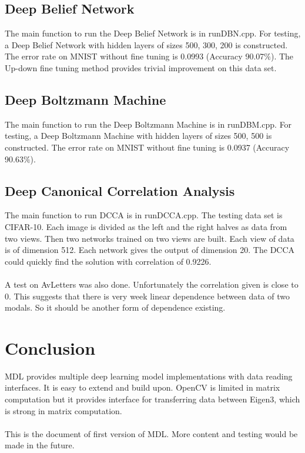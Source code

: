 \documentclass[12pt]{article}
\begin{document}
\subsection{Deep Belief Network}
The main function to run the Deep Belief Network is in runDBN.cpp. For testing, a Deep Belief Network with hidden layers of sizes 500, 300, 200 is constructed. The error rate on MNIST without fine tuning is 0.0993 (Accuracy 90.07$\%$). The Up-down fine tuning method provides trivial improvement on this data set.
\subsection{Deep Boltzmann Machine}
The main function to run the Deep Boltzmann Machine is in runDBM.cpp. For testing, a Deep Boltzmann Machine with hidden layers of sizes 500, 500 is constructed. The error rate on MNIST without fine tuning is 0.0937 (Accuracy 90.63$\%$).
\subsection{Deep Canonical Correlation Analysis}
The main function to run DCCA is in runDCCA.cpp. The testing data set is CIFAR-10. Each image is divided as the left and the right halves as data from two views. Then two networks trained on two views are built. Each view of data is of dimension 512. Each network gives the output of dimension 20. The DCCA could quickly find the solution with correlation of 0.9226.\\
\\
A test on AvLetters was also done. Unfortunately the correlation given is close to 0. This suggests that there is very week linear dependence between data of two modals. So it should be another form of dependence existing.
\clearpage
\section{Conclusion}
MDL provides multiple deep learning model implementations with data reading interfaces. It is easy to extend and build upon. OpenCV is limited in matrix computation but it provides interface for transferring data between Eigen3, which is strong in matrix computation.\\
\\
This is the document of first version of MDL. More content and testing would be made in the future.
\clearpage



\nocite{*}


\end{document}
